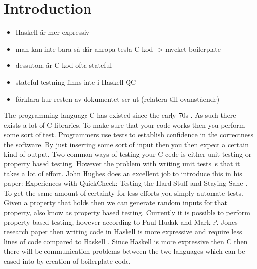 \section{Introduction}

\begin{itemize}
  \item Haskell är mer expressiv
  \item man kan inte bara så där anropa testa C kod -> mycket boilerplate
  \item dessutom är C kod ofta stateful
  \item stateful testning finns inte i Haskell QC
  \item förklara hur resten av dokumentet ser ut (relatera till ovanstående)
\end{itemize}

The programming language C has existed since the early 70s \citep{website:en.wikipedia.org}.
As such there exists a lot of C libraries. 
To make sure that your code works then you perform some sort of test.
Programmers use tests to establish confidence in the correctness the software.
By just inserting some sort of input then you then expect a certain kind of output.
Two common ways of testing your C code is either unit testing or property based testing.
However the problem with writing unit tests is that it takes a lot of effort.
John Hughes does an excellent job to introduce this in his paper:
Experiences with QuickCheck: Testing the Hard Stuff and Staying Sane \citep{QuickCheckQuviq}.
To get the same amount of certainty for less efforts you simply automate tests.
Given a property that holds then we can generate random inputs for that property, also know as property based testing.
Currently it is possible to perform property based testing, however according to Paul Hudak and Mark P. Jones research paper then writing code in Haskell is more expressive and require less lines of code compared to Haskell \citep{HaskellVsWorld}.
Since Haskell is more expressive then C then there will be communication problems between the two languages which can be eased into by creation of boilerplate code.




